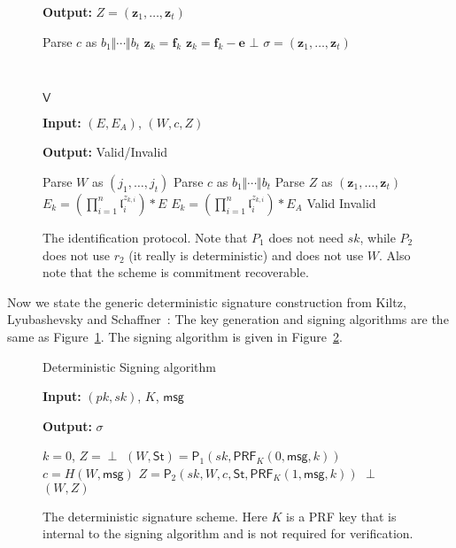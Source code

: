 \documentclass{llncs}
\newcommand{\msg}{\textsf{msg}}
\renewcommand{\l}{\mathfrak{l}}
\newcommand{\e}{\textbf{e}}
\newcommand{\f}{\textbf{f}}
\newcommand{\z}{\textbf{z}}
\newcommand{\PP}{\textsf{P}}
\newcommand{\VV}{\textsf{V}}
\newcommand{\St}{\textsf{St}}
\newcommand{\PRF}{\textsf{PRF}}
\begin{document}
\begin{figure}
\begin{minipage}{0.45\textwidth}
\begin{algorithm}[H]
	\textbf{Output:} $Z = (\z_1, \dots, \z_t)$

	\begin{algorithmic}[1]
		\State Parse $c$ as $b_1 \Vert \cdots \Vert b_t$
		\State $\z_k = \f_k$
		\Else
		\State $\z_k = \f_k - \e$
		\EndIf
		\If{$\z_{k} \not\in [-ntB,ntB]^n$} \State \Return $\bot$ \EndIf
		\EndFor
		\State \Return $\sigma = (\z_1, \dots, \z_t)$
	\end{algorithmic}
\end{algorithm}
\end{minipage}
 \ \ \ \ \ \ \ \ \ \ \ \ 
\begin{minipage}{0.45\textwidth}
\begin{algorithm}[H]
	\caption{$\VV$}
	\textbf{Input:} $(E,E_A)$, $(W,c,Z)$

	\textbf{Output:} Valid/Invalid

	\begin{algorithmic}[1]
		\State Parse $W$ as $(j_1 , \dots, j_t)$
		\State Parse $c$ as $b_1 \Vert \cdots \Vert b_t$
		\State Parse $Z$ as $(\z_1, \dots, \z_t)$
		\State $E_k = ( \prod_{i=1}^n \l_i^{z_{k,i}} ) * E$
		\Else
		\State $E_k = ( \prod_{i=1}^n \l_i^{z_{k,i}} ) * E_A$
		\EndIf
		\EndFor
		 \State \Return Valid
		\Else \State \Return Invalid \EndIf
	\end{algorithmic}
\end{algorithm}
\end{minipage}
\caption{The identification protocol. Note that $P_1$ does not need $sk$, while $P_2$ does not use $r_2$ (it really is deterministic) and does not use $W$. Also note that the scheme is commitment recoverable. \label{fig:id-scheme}}
\end{figure}


Now we state the generic deterministic signature construction from Kiltz, Lyubashevsky and Schaffner~\cite{KLS18}:
The key generation and signing algorithms are the same as Figure~\ref{fig:id-scheme}. The signing algorithm is given in Figure~\ref{fig:sign}. 

\begin{figure}
\begin{algorithm}[H]
	\caption{Deterministic Signing algorithm}
	\textbf{Input:} $(pk,sk)$, $K$, $\msg$

	\textbf{Output:} $\sigma$

	\begin{algorithmic}[1]
		\State $k = 0$, $Z = \perp$
		\State $(W,\St) = \PP_1( sk, \PRF_K( 0, \msg, k ))$
		\State $c = H( W, \msg )$ 
		\State $Z = \PP_2( sk, W, c, \St, \PRF_K( 1, \msg, k ))$
		\EndWhile
		\State \Return $\perp$
		\Else
		\State \Return $(W,Z)$
		\EndIf
	\end{algorithmic}
\end{algorithm}
\caption{The deterministic signature scheme. Here $K$ is a PRF key that is internal to the signing algorithm and is not required for verification. \label{fig:sign}}
\end{figure}
\end{document}
